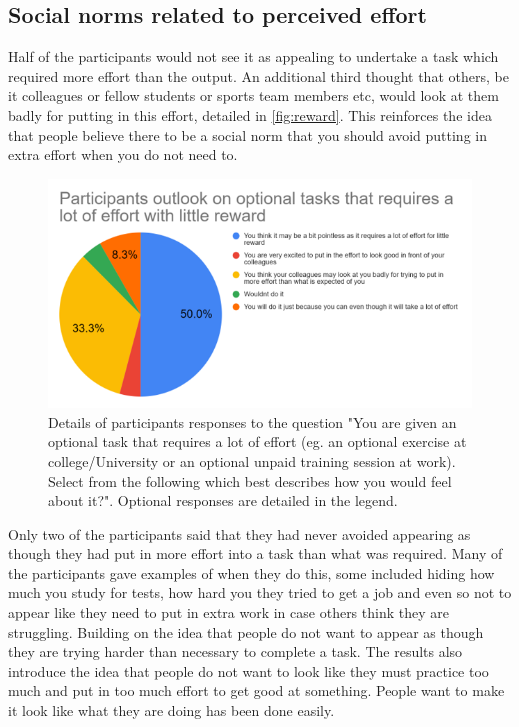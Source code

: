 \documentclass{l4proj}
\begin{document}
\subsection{Social norms related to perceived effort}

Half of the participants would not see it as appealing to undertake a task which required more effort than the output. An additional third thought that others, be it colleagues or fellow students or sports team members etc, would look at them badly for putting in this effort, detailed in \autoref{fig:reward}. This reinforces the idea that people believe there to be a social norm that you should avoid putting in extra effort when you do not need to. 

\begin{figure}[!htb]
    \centering
    \includegraphics[width=\textwidth]{images/littleReward.png}
        \caption{Details of participants responses to the question "You are given an optional task that requires a lot of effort (eg. an optional exercise at college/University or an optional unpaid training session at work). Select from the following which best describes how you would feel about it?". Optional responses are detailed in the legend.}
        \label{fig:reward}
\end{figure}

Only two of the participants said that they had never avoided appearing as though they had put in more effort into a task than what was required. Many of the participants gave examples of when they do this, some included hiding how much you study for tests, how hard you they tried to get a job and even so not to appear like they need to put in extra work in case others think they are struggling. Building on the idea that people do not want to appear as though they are trying harder than necessary to complete a task. The results also introduce the idea that people do not want to look like they must practice too much and put in too much effort to get good at something. People want to make it look like what they are doing has been done easily. 
\end{document}
